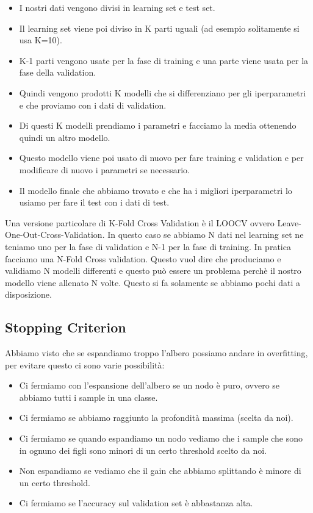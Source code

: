 \documentclass[14pt]{extreport}
\begin{document}
\begin{itemize}
	\item I nostri dati vengono divisi in learning set e test set.
	\item Il learning set viene poi diviso in K parti uguali (ad esempio solitamente si usa K=10).
	\item K-1 parti vengono usate per la fase di training e una parte viene usata per la fase della validation.
	\item Quindi vengono prodotti K modelli che si differenziano per gli iperparametri e che proviamo con i dati di validation.
	\item Di questi K modelli prendiamo i parametri e facciamo la media ottenendo quindi un altro modello.
	\item Questo modello viene poi usato di nuovo per fare training e validation e per modificare di nuovo i parametri se necessario.
	\item Il modello finale che abbiamo trovato e che ha i migliori iperparametri lo usiamo per fare il test con i dati di test.
\end{itemize}


Una versione particolare di K-Fold Cross Validation è il LOOCV ovvero Leave-One-Out-Cross-Validation. In questo caso se abbiamo N dati nel learning
set ne teniamo uno per la fase di validation e N-1 per la fase di training. In pratica facciamo una N-Fold Cross validation. Questo vuol dire che
produciamo e validiamo N modelli differenti e questo può essere un problema perchè il nostro modello viene allenato N volte. Questo si fa solamente se
abbiamo pochi dati a disposizione.

\subsection{Stopping Criterion}

Abbiamo visto che se espandiamo troppo l’albero possiamo andare in overfitting, per evitare questo ci sono varie possibilità:
\begin{itemize}
	\item Ci fermiamo con l’espansione dell’albero se un nodo è puro, ovvero se abbiamo tutti i sample in una classe.
	\item Ci fermiamo se abbiamo raggiunto la profondità massima (scelta da noi).
	\item Ci fermiamo se quando espandiamo un nodo vediamo che i sample che sono in ognuno dei figli sono minori di un certo threshold scelto da noi.
	\item Non espandiamo se vediamo che il gain che abbiamo splittando è minore di un certo threshold.
	\item Ci fermiamo se l’accuracy sul validation set è abbastanza alta.
\end{itemize}
\end{document}
